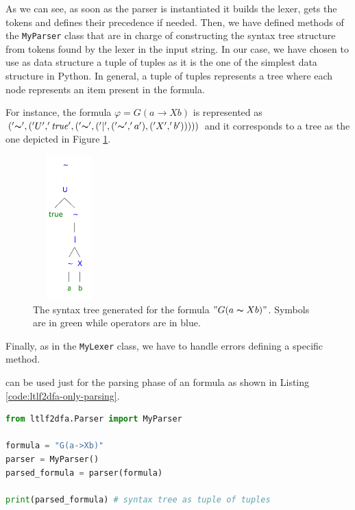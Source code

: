 As we can see, as soon as the parser is instantiated it builds the lexer, gets the tokens and defines their precedence if needed. Then, we have defined methods of the \texttt{MyParser} class that are in charge of constructing the syntax tree structure from tokens found by the lexer in the input string. In our case, we have chosen to use as data structure a tuple of tuples as it is the one of the simplest data structure in Python. In general, a tuple of tuples represents a tree where each node represents an item present in the formula.

For instance, the \LTLf formula $\varphi= G(a \rightarrow X b)$ is represented as $('\thicksim', ('U', '\mathit{true}', ('\thicksim',('|', ('\thicksim', 'a'), ('X', 'b')))))$ and it corresponds to a tree as the one depicted in Figure \ref{fig:formula-syntax-tree}.
\begin{figure}[h]
	\centering
	\includegraphics[height=15em, width=7.5em]{images/formula-syntax-tree}
	\caption{The syntax tree generated for the formula $"G(a \thicksim Xb)"$. Symbols are in green while operators are in blue.}
	\label{fig:formula-syntax-tree}
\end{figure}
Finally, as in the \texttt{MyLexer} class, we have to handle errors defining a specific method.

\LTLfToDFA can be used just for the parsing phase of an 	\LTLf formula as shown in Listing \ref{code:ltlf2dfa-only-parsing}.
\begin{lstlisting}[language=Python, style=Python, label={code:ltlf2dfa-only-parsing}, caption={How to use only the parsing phase of \LTLfToDFA.}]
from ltlf2dfa.Parser import MyParser

formula = "G(a->Xb)"
parser = MyParser()
parsed_formula = parser(formula)

print(parsed_formula) # syntax tree as tuple of tuples
\end{lstlisting}
